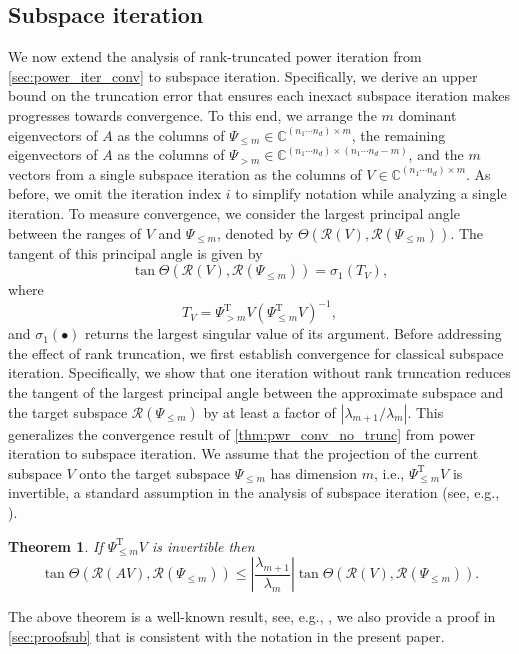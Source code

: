 \documentclass[10pt,preprint]{elsarticle}
\newtheorem{theorem}{\bf Theorem}[section]
\renewcommand{\top}{\text{T}}
\def\R{\mathcal{R}}
\begin{document}
\subsection{Subspace iteration}

We now extend the analysis of rank-truncated power iteration from \cref{sec:power_iter_conv} to subspace iteration. Specifically, we derive an upper bound on the truncation error that ensures each inexact subspace iteration makes progresses towards convergence. To this end, we arrange the $m$ dominant eigenvectors of $A$ as the columns of 
$\Psi_{\leq m} \in \mathbb{C}^{(n_1 \cdots n_d) \times m}$, the remaining eigenvectors of $A$ as the columns of $\Psi_{>m}\in \mathbb{C}^{(n_1 \cdots n_d) \times (n_1\cdots n_d - m)}$, and the $m$ vectors from a single subspace iteration as the columns of $V \in \mathbb{C}^{(n_1 \cdots n_d) \times m}$. As before, we omit the iteration index $i$ to simplify notation while analyzing a single iteration. 
%
To measure convergence, we consider the largest principal angle between the ranges of $V$ and $\Psi_{\leq m}$, denoted by $\Theta(\R(V),\R(\Psi_{\leq m}))$. The tangent of this principal angle is given by \cite[Theorem 5.1]{knyazev2012principal} 
\begin{equation} \label{eq:tan_princ_angle}
\tan \Theta(\R(V),\R(\Psi_{\leq m})) = \sigma_1(T_V),
\end{equation}
where 
\begin{equation} \label{eq:Tv_def}
T_V = \Psi_{>m}^{\top} V \left(\Psi_{\leq m}^{\top} V\right)^{-1}, 
\end{equation}
and $\sigma_1(\bullet)$ returns the largest singular value of its argument. Before addressing the effect of rank truncation, we first establish convergence for classical subspace iteration. Specifically, we show that one iteration without rank truncation reduces the tangent of the largest principal angle between the approximate subspace and the target subspace $\R(\Psi_{\leq m})$ by at least a factor of $|\lambda_{m+1}/\lambda_m|$. This generalizes the convergence result of \cref{thm:pwr_conv_no_trunc} from power iteration to subspace iteration. We assume that the projection of the current subspace $V$ onto the target subspace $\Psi_{\leq m}$ has dimension $m$, i.e., $\Psi_{\leq m}^{\top} V$ is invertible, a standard assumption in the analysis of subspace iteration (see, e.g., \cite[Theorem 5.2]{Saad2011}). 
%
\begin{theorem} \label{thm:sub_conv}
If $\Psi_{\leq m}^{\top} V$ is invertible then 
\begin{equation}
    \tan\Theta(\R(AV),\R(\Psi_{\leq m})) \leq \left|\frac{\lambda_{m+1}}{\lambda_m}\right| \tan\Theta(\R(V),\R(\Psi_{\leq m})). 
\end{equation}
\end{theorem}
The above theorem is a well-known result, see, e.g., \cite{Saad_2016}, we also provide a proof in \cref{sec:proofsub} that is consistent with the notation in the present paper. 
\end{document}

